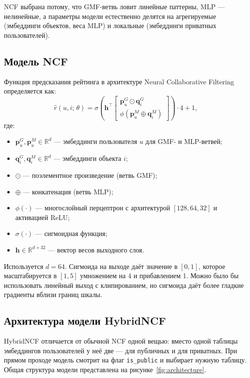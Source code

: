 \documentclass[14pt,a4paper]{extarticle}
\begin{document}
NCF выбрана потому, что GMF-ветвь ловит линейные паттерны, MLP --- нелинейные, а параметры модели естественно делятся на агрегируемые (эмбеддинги объектов, веса MLP) и локальные (эмбеддинги приватных пользователей).


\subsection{Модель NCF}

Функция предсказания рейтинга в архитектуре Neural Collaborative Filtering~\cite{he2017neural} определяется как:
\begin{equation}
\hat{r}(u, i;\, \theta) = \sigma\!\left( \mathbf{h}^\top \begin{bmatrix} \mathbf{p}_u^{G} \odot \mathbf{q}_i^{G} \\ \phi(\mathbf{p}_u^{M} \oplus \mathbf{q}_i^{M}) \end{bmatrix} \right) \cdot 4 + 1,
\label{eq:ncf}
\end{equation}
где:
\begin{itemize}
  \item $\mathbf{p}_u^{G}, \mathbf{p}_u^{M} \in \mathbb{R}^d$ --- эмбеддинги пользователя $u$ для GMF- и MLP-ветвей;
  \item $\mathbf{q}_i^{G}, \mathbf{q}_i^{M} \in \mathbb{R}^d$ --- эмбеддинги объекта $i$;
  \item $\odot$ --- поэлементное произведение (ветвь GMF);
  \item $\oplus$ --- конкатенация (ветвь MLP);
  \item $\phi(\cdot)$ --- многослойный перцептрон с архитектурой $[128, 64, 32]$ и активацией ReLU;
  \item $\sigma(\cdot)$ --- сигмоидная функция;
  \item $\mathbf{h} \in \mathbb{R}^{d+32}$ --- вектор весов выходного слоя.
\end{itemize}

Используется $d = 64$. Сигмоида на выходе даёт значение в $[0, 1]$, которое масштабируется в $[1, 5]$ умножением на 4 и прибавлением 1. Можно было бы использовать линейный выход с клипированием, но сигмоида даёт более гладкие градиенты вблизи границ шкалы.


\subsection{Архитектура модели HybridNCF}

HybridNCF отличается от обычной NCF одной вещью: вместо одной таблицы эмбеддингов пользователей у неё две --- для публичных и для приватных. При прямом проходе модель смотрит на флаг \texttt{is\_public} и выбирает нужную таблицу. Общая структура модели представлена на рисунке~\ref{fig:architecture}.
\end{document}
